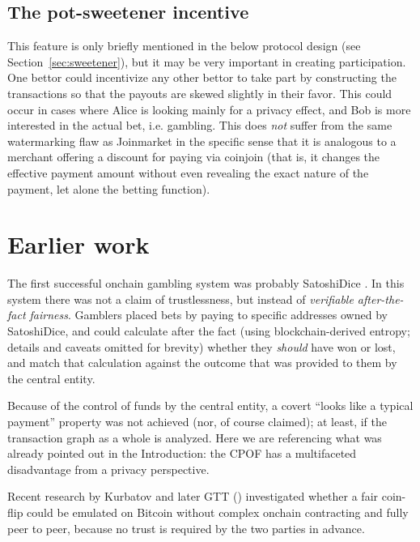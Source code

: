 \documentclass[11pt]{article}
\begin{document}
\subsection{The pot-sweetener incentive}
\label{sec:potsweet}

This feature is only briefly mentioned in the below protocol design (see Section~\ref{sec:sweetener}), but it may be very important in creating participation. One bettor could incentivize any other bettor to take part by constructing the transactions so that the payouts are skewed slightly in their favor. This could occur in cases where Alice is looking mainly for a privacy effect, and Bob is more interested in the actual bet, i.e. gambling. This does \emph{not} suffer from the same watermarking flaw as Joinmarket \cite{joinmarket} in the specific sense that it is analogous to a merchant offering a discount for paying via coinjoin (that is, it changes the effective payment amount without even revealing the exact nature of the payment, let alone the betting function).

\section{Earlier work}
\label{sec:motivation}

The first successful onchain gambling system was probably SatoshiDice \cite{satoshidice}. In this system there was not a claim of trustlessness, but instead of \emph{verifiable after-the-fact fairness}. Gamblers placed bets by paying to specific addresses owned by SatoshiDice, and could calculate after the fact (using blockchain-derived entropy; details and caveats omitted for brevity) whether they \emph{should} have won or lost, and match that calculation against the outcome that was provided to them by the central entity.

Because of the control of funds by the central entity, a covert ``looks like a typical payment'' property was not achieved (nor, of course claimed); at least, if the transaction graph as a whole is analyzed. Here we are referencing what was already pointed out in the Introduction: the CPOF has a multifaceted disadvantage from a privacy perspective.

Recent research by Kurbatov and later GTT (\cite{kurbatov2025oprand,gerhardt2026}) investigated whether a fair coin-flip could be emulated on Bitcoin without complex onchain contracting and fully peer to peer, because no trust is required by the two parties in advance.
\end{document}
